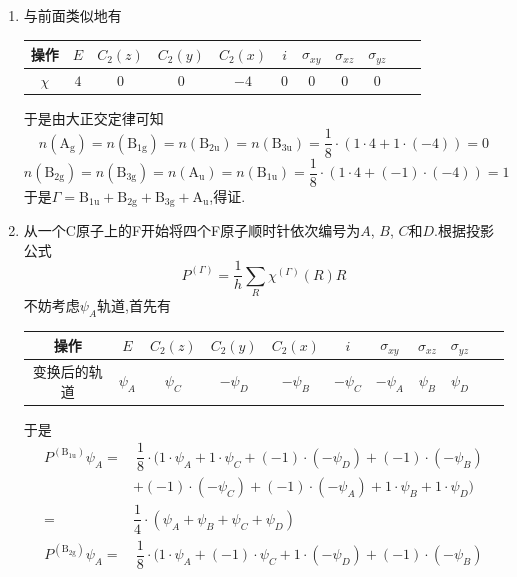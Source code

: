 \documentclass{ctexart}
\begin{document}
\begin{solution}
\begin{enumerate}[label=\tbf{(\alph*)}]
    \item 与前面类似地有
    \begin{table}[H]\centering
        \begin{tabular}{|c|c|c|c|c|c|c|c|c|c|c|}\hline
            操作 & $E$ & $C_2(z)$ & $C_2(y)$ & $C_2(x)$ & $i$ & $\sigma_{xy}$ & $\sigma_{xz}$ & $\sigma_{yz}$ \\\hline
            $\chi$ & $4$ & $0$ & $0$ & $-4$ & $0$ & $0$ & $0$ & $0$ \\\hline
        \end{tabular}
    \end{table}
    于是由大正交定律可知
    \[n(\text{A}_\text{g})=n(\text{B}_{1\text{g}})=n(\text{B}_{2\text{u}})=n(\text{B}_{3\text{u}})=\dfrac18\cdot(1\cdot4+1\cdot(-4))=0\]
    \[n(\text{B}_{2\text{g}})=n(\text{B}_{3\text{g}})=n(\text{A}_{\text{u}})=n(\text{B}_{1\text{u}})=\dfrac18\cdot(1\cdot4+(-1)\cdot(-4))=1\]
    于是$\Gamma= \text{B}_{1\text{u}}+\text{B}_{2\text{g}}+\text{B}_{3\text{g}}+\text{A}_{\text{u}}$,得证.
    \item 从一个C原子上的F开始将四个F原子顺时针依次编号为$A$, $B$, $C$和$D$.根据投影公式
    \[P^{(\Gamma)}=\dfrac{1}{h}\sum_{R}\chi^{(\Gamma)}(R)R\]
    不妨考虑$\psi_A$轨道,首先有
    \begin{table}[H]\centering
        \begin{tabular}{|c|c|c|c|c|c|c|c|c|c|c|}\hline
            操作 & $E$ & $C_2(z)$ & $C_2(y)$ & $C_2(x)$ & $i$ & $\sigma_{xy}$ & $\sigma_{xz}$ & $\sigma_{yz}$ \\\hline
            变换后的轨道 & $\psi_A$ & $\psi_C$ & $-\psi_D$ & $-\psi_B$ & $-\psi_C$ & $-\psi_A$ & $\psi_B$ & $\psi_D$ \\\hline
        \end{tabular}
    \end{table}
    于是
    \[\begin{aligned}
        P^{(\text{B}_{1\text{u}})}\psi_A
        =&\ \dfrac18\cdot(1\cdot\psi_A+1\cdot\psi_C+(-1)\cdot(-\psi_D)+(-1)\cdot(-\psi_B)\\
        &+(-1)\cdot(-\psi_C)+(-1)\cdot(-\psi_A)+1\cdot\psi_B+1\cdot\psi_D)\\
        =\ &\dfrac14\cdot(\psi_A+\psi_B+\psi_C+\psi_D)
    \end{aligned}\]
    \[\begin{aligned}
        P^{(\text{B}_{2\text{g}})}\psi_A
        =&\ \dfrac18\cdot(1\cdot\psi_A+(-1)\cdot\psi_C+1\cdot(-\psi_D)+(-1)\cdot(-\psi_B)\\

\end{aligned}\]
\end{enumerate}
\end{solution}
\end{document}
